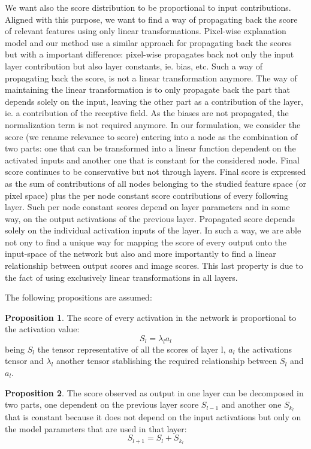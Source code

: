 \documentclass[preprint]{elsarticle}
\theoremstyle{definition} %
\newtheorem{proposition}{Proposition}%
\theoremstyle{remark}
\begin{document}
We want also the score distribution to be proportional to input contributions. Aligned with this purpose, we want to find a way of propagating back the score of relevant features using only linear transformations. Pixel-wise explanation model and our method use a similar approach for propagating back the scores but with a important difference: pixel-wise propagates back not only the input layer contribution but also layer constants, ie. bias, etc. Such a way of propagating back the score, is not a linear transformation anymore. The way of maintaining the linear transformation is to only propagate back the part that depends solely on the input, leaving the other part as a contribution of the layer, ie. a contribution of the receptive field. As the biases are not propagated, the normalization term is not required anymore. In our formulation, we consider the score (we rename relevance to score) entering into a node as the combination of two parts: one that can be transformed into a linear function dependent on the activated inputs and another one that is constant for the considered node. Final score continues to be conservative but not through layers. Final score is expressed as the sum of contributions of all nodes belonging to the studied feature space (or pixel space) plus the per node constant score contributions of every following layer. Such per node constant scores depend on layer parameters and in some way, on the output activations of the previous layer. Propagated score depends solely on the individual activation inputs of the layer. In such a way, we are able not ony to find a unique way for mapping the score of every output onto the input-space of the network but also and more importantly to find a linear relationship between output scores and image scores. This last property is due to the fact of using exclusively linear transformations in all layers.

The following propositions are assumed:

\begin{proposition}
	The score of every activation in the network is proportional to the activation value:
	\begin{equation}
		 S_l = \lambda_l a_{l}
	\end{equation}
	being $S_l$ the tensor representative of all the scores of layer l, $a_l$ the activations tensor and $\lambda_l$ another tensor stablishing the required relationship between $S_l$ and $a_l$.
\end{proposition}

\begin{proposition}
	The score observed as output in one layer can be decomposed in two parts, one dependent on the previous layer score $S_{l-1}$ and another one $S_{k_l}$  that is constant because it does not depend on the input activations but only on the model parameters that are used in that layer:
	\begin{equation}
		S_{l+1}=S_{l} + S_{k_l}
	\end{equation}
\end{proposition}
\end{document}
